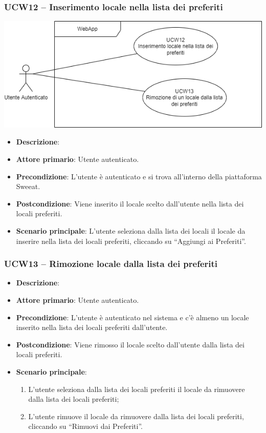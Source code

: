 
\subsubsection{UCW12 – Inserimento locale nella lista dei preferiti}
\begin{center}
    \includegraphics[scale=0.5]{UC_images/UCW12-13.png} 
    \end{center}
\begin{itemize}
    \item \textbf{Descrizione}:
    \item \textbf{Attore primario}: Utente autenticato.
    \item \textbf{Precondizione}: L'utente è autenticato e si trova all’interno della piattaforma Sweeat.
    \item \textbf{Postcondizione}: Viene inserito il locale scelto dall’utente nella lista dei locali preferiti.
    \item \textbf{Scenario principale}: L’utente seleziona dalla lista dei locali il locale da inserire nella lista dei locali preferiti, cliccando su “Aggiungi ai Preferiti”.
\end{itemize}

\subsubsection{UCW13 – Rimozione locale dalla lista dei preferiti}

\begin{itemize}
    \item \textbf{Descrizione}:
    \item \textbf{Attore primario}: Utente autenticato.
    \item \textbf{Precondizione}:  L’utente è autenticato nel sistema e c'è almeno un locale inserito nella lista dei locali preferiti dall’utente.
    \item \textbf{Postcondizione}: Viene rimosso il locale scelto dall’utente dalla lista dei locali preferiti.
    \item \textbf{Scenario principale}:
    \begin{enumerate}
        \item L’utente seleziona dalla lista dei locali preferiti il locale da rimuovere dalla lista dei locali preferiti;
        \item L’utente rimuove il locale da rimuovere dalla lista dei locali preferiti, cliccando su “Rimuovi dai Preferiti”.
    \end{enumerate}
\end{itemize}
